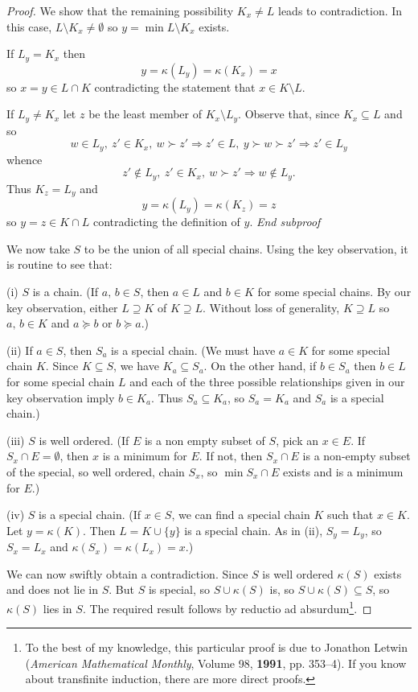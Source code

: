\begin{proof}
We show that the remaining possibility $K_{x}\neq L$ leads
to contradiction. In this case, $L\setminus K_{x}\neq \emptyset$
so $y=\min L\setminus K_{x}$ exists. 

If $L_{y}=K_{x}$
then
\[y=\kappa(L_{y})=\kappa(K_{x})=x\]
so $x=y\in L\cap K$ contradicting the statement that $x\in K\setminus L$.

If $L_{y}\neq K_{x}$ let $z$
be the least member of $K_{x}\setminus L_{y}$.   
Observe that, since $K_{x}\subseteq L$
and so
\[w\in L_{y},\ z'\in K_{x},\ w\succ z'\Rightarrow
z'\in L,\ y\succ w\succ z'\Rightarrow z'\in L_{y}\]
whence
\[z'\notin L _{y},\ z'\in K_{x},\ w\succ z'\Rightarrow
w\notin L_{y}.\]
Thus $K_{z}=L_{y}$ and
\[y=\kappa(L_{y})=\kappa(K_{z})=z\]
so $y=z\in K\cap L$ contradicting the definition of $y$.
\newline\emph{End subproof}

We now take $S$ to be the union of all special chains.
Using the key observation, it is routine to see that:

(i) $S$ is a chain. (If $a,\,b\in S$, then $a\in L$ and $b\in K$
for some special chains. By our key observation, either $L\supseteq K$
of $K\supseteq L$. Without loss of generality, $K\supseteq L$ so $a,\,b \in K$
and $a\succeq b$ or $b\succeq a$.)

(ii) If $a\in S$, then $S_{a}$ is a special chain. (We must have
$a\in K$ for some special chain $K$. Since $K\subseteq S$, we have 
$K_{a}\subseteq S_{a}$. On the other hand, if $b\in S_{a}$
then $b\in L$ for some special chain $L$  and each of the three
possible relationships given in our key observation imply $b\in K_{a}$.
Thus $S_{a}\subseteq K_{a}$, so $S_{a}=K_{a}$ and $S_{a}$ is a special chain.)

(iii) $S$ is well ordered. (If $E$ is a non empty subset of $S$,
pick an $x\in E$. If $S_{x}\cap E=\emptyset$, then $x$ is a minimum for $E$.
If not, then $S_{x}\cap E$ is a non-empty subset of the special, so
well ordered, chain  $S_{x}$, so $\min S_{x}\cap E$ 
exists and is a minimum for $E$.)

(iv) $S$ is a special chain. (If $x\in S$, we can find a special chain $K$
such that $x\in K$. Let $y=\kappa(K)$. Then $L=K\cup\{y\}$ is a special
chain. As in (ii), $S_{y}=L_{y}$, so $S_{x}=L_{x}$ and
$\kappa(S_{x})=\kappa(L_{x})=x$.)

We can now swiftly obtain a contradiction. Since $S$ is well ordered
$\kappa(S)$ exists and does not lie in $S$. But $S$ is special,
so $S\cup \kappa(S)$ is, so $S\cup\kappa(S)\subseteq S$,
so $\kappa(S)$ lies in $S$. The required result follows
by reductio ad absurdum\footnote{To the best of my knowledge, 
this particular proof is due to
Jonathon Letwin (\emph{American Mathematical Monthly},
Volume 98, {\bf 1991}, pp. 353--4). If you know about
transfinite induction, there are more direct proofs.}.
\end{proof}
